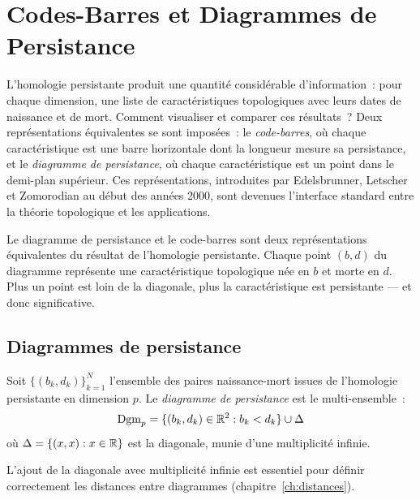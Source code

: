 \chapter{Codes-Barres et Diagrammes de Persistance}
\label{ch:diagrammes}

L'homologie persistante produit une quantit\'e consid\'erable d'information~: pour chaque dimension, une liste de caract\'eristiques topologiques avec leurs dates de naissance et de mort. Comment visualiser et comparer ces r\'esultats~? Deux repr\'esentations \'equivalentes se sont impos\'ees~: le \emph{code-barres}, o\`u chaque caract\'eristique est une barre horizontale dont la longueur mesure sa persistance, et le \emph{diagramme de persistance}, o\`u chaque caract\'eristique est un point dans le demi-plan sup\'erieur. Ces repr\'esentations, introduites par Edelsbrunner, Letscher et Zomorodian au d\'ebut des ann\'ees 2000, sont devenues l'interface standard entre la th\'eorie topologique et les applications.

\begin{intuition}
Le diagramme de persistance et le code-barres sont deux repr\'esentations
\'equivalentes du r\'esultat de l'homologie persistante. Chaque point
$(b, d)$ du diagramme repr\'esente une caract\'eristique topologique
n\'ee en $b$ et morte en $d$. Plus un point est loin de la diagonale,
plus la caract\'eristique est persistante --- et donc significative.
\end{intuition}

\section{Diagrammes de persistance}

\begin{definition}
Soit $\{(b_k, d_k)\}_{k=1}^N$ l'ensemble des paires naissance-mort
issues de l'homologie persistante en dimension $p$. Le \emph{diagramme
de persistance} est le multi-ensemble~:
\[
  \mathrm{Dgm}_p = \{(b_k, d_k) \in \mathbb{R}^2 : b_k < d_k\}
  \cup \Delta
\]
o\`u $\Delta = \{(x, x) : x \in \mathbb{R}\}$ est la diagonale, munie d'une
multiplicit\'e infinie.
\end{definition}

\begin{remarque}
L'ajout de la diagonale avec multiplicit\'e infinie est essentiel pour
d\'efinir correctement les distances entre diagrammes (chapitre~\ref{ch:distances}).
\end{remarque}

